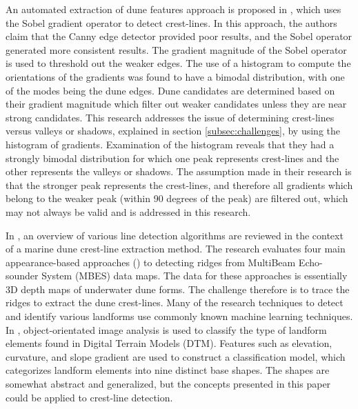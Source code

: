 An automated extraction of dune features approach is proposed in \cite{2015_automated_mapping_of_linear_dunefield}, which uses the Sobel gradient operator to detect crest-lines. In this approach, the authors claim that the Canny edge detector provided poor results, and the Sobel operator generated more consistent results. The gradient magnitude of the Sobel operator is used to threshold out the weaker edges. The use of a histogram to compute the orientations of the gradients was found to have a bimodal distribution, with one of the modes being the dune edges. Dune candidates are determined based on their gradient magnitude which filter out weaker candidates unless they are near strong candidates. This research addresses the issue of determining crest-lines versus valleys or shadows, explained in section \ref{subsec:challenges}, by using the histogram of gradients. Examination of the histogram reveals that they had a strongly bimodal distribution for which one peak represents crest-lines and the other represents the valleys or shadows. The assumption made in their research is that the stronger peak represents the crest-lines, and therefore all gradients which belong to the weaker peak (within 90 degrees of the peak) are filtered out, which may not always be valid and is addressed in this research.

In \cite{2016_comparisons_crest_line_extraction_marine_dunes}, an overview of various line detection algorithms are reviewed in the context of a marine dune crest-line extraction method. The research evaluates four main appearance-based approaches (\cite{2005_topology_driven_algorithms_for_ridge_extraction,2005_smooth_feature_lines_surface_meshes,2004_ridge_valley_lines_meshes_surface_fitting}) to detecting ridges from MultiBeam Echo-sounder System (MBES) data maps. The data for these approaches is essentially 3D depth maps of underwater dune forms. The challenge therefore is to trace the ridges to extract the dune crest-lines. Many of the research techniques to detect and identify various landforms use commonly known machine learning techniques. In \cite{2006_automated_classification_landform_elements}, object-orientated image analysis is used to classify the type of landform elements found in Digital Terrain Models (DTM). Features such as elevation, curvature, and slope gradient are used to construct a classification model, which categorizes landform elements into nine distinct base shapes. The shapes are somewhat abstract and generalized, but the concepts presented in this paper could be applied to crest-line detection.

